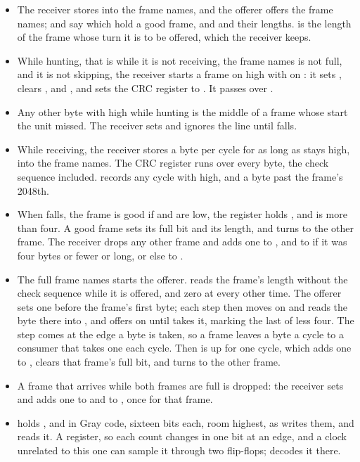 \begin{itemize}
\item The receiver stores into the frame  names, and the
offerer offers the frame  names;  and
 say which hold a good frame, and  and
 their lengths.  is the length of the frame
whose turn it is to be offered, which the receiver keeps.
\item While hunting, that is while it is not receiving, the frame
 names is not full, and it is not skipping, the receiver
starts a frame on  high with  on :
it sets , clears ,  and
, and sets the CRC register to . It passes
over .
\item Any other byte with  high while hunting is the middle
of a frame whose start the unit missed. The receiver sets 
and ignores the line until  falls.
\item While receiving, the receiver stores a byte per cycle for as long
as  stays high, into the frame  names. The
CRC register runs over every byte, the check sequence included.
 records any cycle with  high, and 
a byte past the frame's 2048th.
\item When  falls, the frame is good if  and
 are low, the register holds , and
 is more than four. A good frame sets its full bit and its
length, and  turns to the other frame. The receiver drops
any other frame and adds one to , and to
 if it was four bytes or fewer or long, or else to
.
\item The full frame  names starts the offerer.
 reads the frame's length without the check sequence
while it is offered, and zero at every other time. The offerer sets
 one before the frame's first byte; each step then moves
 on and reads the byte there into , and offers
 on  until  takes it, marking the last of
 less four. The step comes at the edge a byte is taken, so
a frame leaves a byte a cycle to a consumer that takes one each cycle.
Then  is up for one cycle, which adds one to
, clears that frame's full bit, and turns  to
the other frame.
\item A frame that arrives while both frames are full is dropped: the
receiver sets  and adds one to  and to
, once for that frame.
\item {} holds ,  and
 in Gray code, sixteen bits each, room highest, as
 writes them, and  reads it. A register,
so each count changes in one bit at an edge, and a clock unrelated to
this one can sample it through two flip-flops;  decodes
it there.
\end{itemize}

